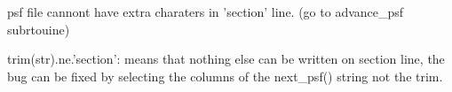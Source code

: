 
\begin{DoxyRefList}
\item[\label{bug__bug000001}%
\hypertarget{bug__bug000001}{}%
Type \hyperlink{classmolreader}{molreader} ]psf file cannont have extra charaters in 'section' line. (go to advance\+\_\+psf subrtouine)  
\item[\label{bug__bug000002}%
\hypertarget{bug__bug000002}{}%
Subprogram \hyperlink{classmolreader_a7a4cb6436916cd4b8ee0341d528e9c73}{molreader\+:\+:advance\+\_\+psf} (section, nrecord)]trim(str).ne.'section'\+: means that nothing else can be written on section line, the bug can be fixed by selecting the columns of the next\+\_\+psf() string not the trim. 
\end{DoxyRefList}